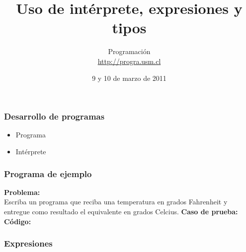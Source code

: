 \documentclass[12pt]{beamer}
\title{Uso de intérprete, expresiones y tipos}
\author{
  Programación \\ \url{http://progra.usm.cl}
}
\date{9 y 10 de marzo de 2011}
\begin{document}
  \begin{frame}
    \maketitle
  \end{frame}

  \begin{frame}
    \frametitle{Desarrollo de programas}\label{conceptos}
    \begin{itemize}
      \item Programa
      \item Intérprete
    \end{itemize}
  \end{frame}

  \begin{frame}
    \frametitle{Programa de ejemplo}\label{prog-ejemplo}
    \textbf{Problema:}\\
    Escriba un programa que reciba una temperatura en grados Fahrenheit
    y entregue como resultado el equivalente en grados Celcius.
    \vfill
    \textbf{Caso de prueba:}\\
    
    \vfill
    \textbf{Código:}\\
    
  \end{frame}

  \begin{frame}
    \frametitle{Expresiones}\label{ejemplos-expresiones}

    

  \end{frame}
\end{document}
